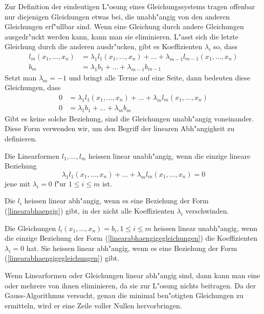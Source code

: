 Zur Definition der eindeutigen L"osung eines Gleichungssystems 
tragen offenbar nur diejenigen Gleichungen etwas bei, die unabh"angig
von den anderen Gleichungen erf"ullbar sind.
Wenn eine Gleichung
durch andere Gleichungen ausgedr"uckt werden kann, kann man sie
eliminieren.
L"asst sich die letzte Gleichung durch die
anderen ausdr"ucken, gibt es Koeffizienten $\lambda_i$ so, dass
\begin{equation*}
\begin{aligned}
l_m(x_1,\dots,x_n)&=\lambda_1 l_1(x_1,\dots,x_n)+\dots+\lambda_{m-1}l_{m-1}(x_1,\dots, x_n)\\
b_m&=\lambda_1b_1+\dots+\lambda_{m-1}b_{m-1}
\end{aligned}
\end{equation*}
Setzt man $\lambda_m=-1$ und bringt alle Terme auf eine Seite,
dann bedeuten diese Gleichungen, dass
\begin{equation}
\begin{aligned}
0&=\lambda_1l_1(x_1,\dots,x_n)+\dots+\lambda_ml_m(x_1,\dots,x_n)\\
0&=\lambda_1b_1+\dots+\lambda_mb_m
\end{aligned}
\label{linearabhaengigegleichungen}
\end{equation}
Gibt es keine solche Beziehung, sind die Gleichungen unabh"angig
voneinander.
Diese Form verwenden wir, um den Begriff der linearen Abh"angigkeit
zu definieren.
\begin{definition}
Die Linearformen $l_1,\dots,l_m$ heissen linear unabh"angig,
wenn die einzige lineare Beziehung
\begin{equation}
\lambda_1l_1(x_1,\dots,x_n)+\dots+\lambda_ml_m(x_1,\dots,x_n)=0
\label{linearabhaengig}
\end{equation}
jene mit $\lambda_i=0$ f"ur $1\le i\le m$ ist.

Die $l_i$ heissen linear abh"angig, wenn es eine Beziehung der Form
(\ref{linearabhaengig})
gibt, in der nicht alle Koeffizienten $\lambda_i$ verschwinden.

Die Gleichungen $l_i(x_1,\dots,x_n)=b_i,1\le i\le m$ heissen linear unabh"angig,
wenn  die einzige Beziehung der Form (\ref{linearabhaengigegleichungen})
die Koeffizienten $\lambda_i=0$ hat.
Sie heissen linear abh"angig, wenn
es eine Beziehung der Form (\ref{linearabhaengigegleichungen}) gibt.
\end{definition}

Wenn Linearformen oder Gleichungen linear abh"angig sind, dann kann
man eine oder mehrere von ihnen eliminieren, da sie zur L"osung nichts
beitragen.
Da der Gauss-Algorithmus versucht, genau die minimal ben"otigten Gleichungen
zu ermitteln, wird er eine Zeile voller Nullen hervorbringen.

